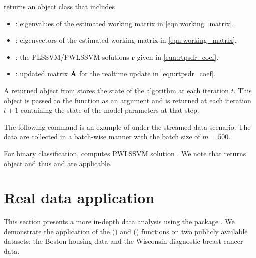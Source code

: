  returns an object  class  that includes
\begin{itemize}
\item {}: eigenvalues of the estimated working matrix in \eqref{eqn:working_matrix}.
\item {}: eigenvectors of the estimated working matrix in \eqref{eqn:working_matrix}.
\item {}: the PLSSVM/PWLSSVM solutions ${\mathbf{r}}$ given in \eqref{eqn:rtpsdr_coef}. 
\item {}: updated matrix $\mathbf{A}$ for the realtime update in \eqref{eqn:rtpsdr_coef}.  
\end{itemize}

A returned object from  stores the state of the algorithm at each iteration $t$. 
This object is passed to the function as an argument and is returned at each iteration $t+1$ containing the state of the model parameters at that step.

The following command is an example of  under the streamed data scenario. The data are collected in a batch-wise manner with the batch size of $m = 500$. 

For binary classification,  computes PWLSSVM solution \citep{jang2023principal}.
We note that  returns  object and thus  and  are applicable.

\section{Real data application}\label{sec:realdata}
This section presents a more in-depth data analysis using the package .
We demonstrate the application of the () and () functions on two publicly available datasets: the Boston housing data and the Wisconsin diagnostic breast cancer data.


